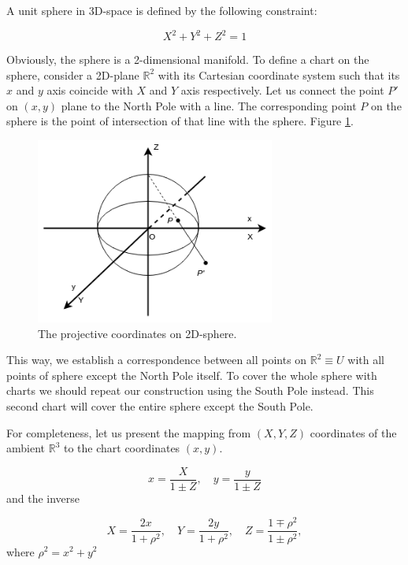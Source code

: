 \documentclass[a4paper,10pt]{article}
\begin{document}
A unit sphere in 3D-space is defined by the following constraint:

\begin{equation}
 X^2 + Y^2 + Z^2 = 1
\end{equation}

Obviously, the sphere is a 2-dimensional manifold. To define a chart on the sphere, consider a 2D-plane $\mathbb{R}^2$ with its Cartesian coordinate system such that its $x$ and $y$ axis coincide with $X$ and $Y$ axis respectively. Let us connect the point $P'$ on $(x,y)$ plane to the North Pole with a line. The corresponding point $P$ on the sphere is the point of intersection of that line with the sphere.  Figure \ref{fig:riemann}.

\begin{figure}[h]
\centering
 \includegraphics[width=0.7\textwidth]{../../images/Sphere.png}
 \caption{The projective coordinates on 2D-sphere.  }
 \label{fig:riemann}
\end{figure}

This way, we establish a correspondence between all points on $\mathbb{R}^2 \equiv U$ with all points of sphere except the North Pole itself. To cover the whole sphere with  charts we should repeat our construction using the South Pole instead. This second chart will cover the entire sphere except the South Pole. 

For completeness, let us present the mapping from $(X,Y,Z)$ coordinates of the ambient $\mathbb{R}^3$ to the chart coordinates $(x,y)$.

\begin{equation}
 x = \frac{X}{1\pm Z},\quad y = \frac{y}{1\pm Z}
\end{equation}
and the inverse 

\begin{equation}
 X = \frac{2x}{1+\rho^2},\quad Y = \frac{2y}{1+\rho^2}, \quad Z = \frac{1\mp\rho^2}{1\pm\rho^2}, 
\end{equation}
where $\rho^2 = x^2 + y^2$
\end{document}
